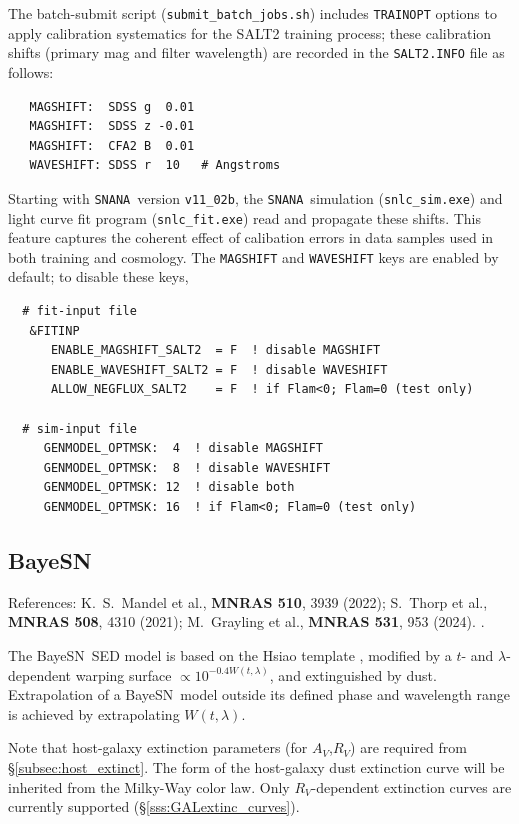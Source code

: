 \documentclass[12pt]{article}
\newcommand{\BAYESN}{{\sc BayeSN}}
\newcommand{\snana}{{\tt SNANA}}
\newcommand{\submit}{\tt submit\_batch\_jobs.sh}
\begin{document}
The batch-submit script ({\submit}) includes {\tt TRAINOPT}
options to apply calibration systematics for the SALT2 training process;
these calibration shifts (primary mag and filter wavelength) 
are recorded in the {\tt SALT2.INFO} file as 
follows:
\begin{verbatim}
   MAGSHIFT:  SDSS g  0.01   
   MAGSHIFT:  SDSS z -0.01 
   MAGSHIFT:  CFA2 B  0.01 
   WAVESHIFT: SDSS r  10   # Angstroms
\end{verbatim}
%
Starting with \snana\ version {\tt v11\_02b}, the \snana\ simulation 
({\tt snlc\_sim.exe}) and light curve fit program ({\tt snlc\_fit.exe})
read and propagate these shifts.
This feature captures the coherent effect of calibation errors in
data samples used in both training and cosmology.
The {\tt MAGSHIFT} and {\tt WAVESHIFT} keys are enabled by default;
to disable these keys,
\begin{verbatim} 
  # fit-input file
   &FITINP
      ENABLE_MAGSHIFT_SALT2  = F  ! disable MAGSHIFT 
      ENABLE_WAVESHIFT_SALT2 = F  ! disable WAVESHIFT
      ALLOW_NEGFLUX_SALT2    = F  ! if Flam<0; Flam=0 (test only)

  # sim-input file
     GENMODEL_OPTMSK:  4  ! disable MAGSHIFT 
     GENMODEL_OPTMSK:  8  ! disable WAVESHIFT 
     GENMODEL_OPTMSK: 12  ! disable both
     GENMODEL_OPTMSK: 16  ! if Flam<0; Flam=0 (test only)
\end{verbatim}
\clearpage
\subsection{\BAYESN}
\label{subsec:bayesn}
References: K.~S.\ Mandel et al., {\bf MNRAS 510}, 3939 (2022); S.\ Thorp et al., {\bf MNRAS 508}, 4310 (2021); M.\ Grayling et al., {\bf MNRAS 531}, 953 (2024). \cite{Mandel2022, Thorp2021, Grayling2024}.

The \BAYESN\ SED model is based on the Hsiao template \cite{Hsiao2007}, modified by a
$t$- and $\lambda$-dependent warping surface $\propto 10^{-0.4 W(t,\lambda)}$, and extinguished by dust.
Extrapolation of a \BAYESN\ model outside its defined phase and wavelength range is achieved
by extrapolating $W(t,\lambda)$.

Note that host-galaxy extinction parameters (for $A_V$,$R_V$) 
are required from \S\ref{subsec:host_extinct}. The form of the host-galaxy
dust extinction curve will be inherited from the Milky-Way color law.
Only $R_V$-dependent extinction curves are currently supported (\S\ref{sss:GALextinc_curves}).
\end{document}
